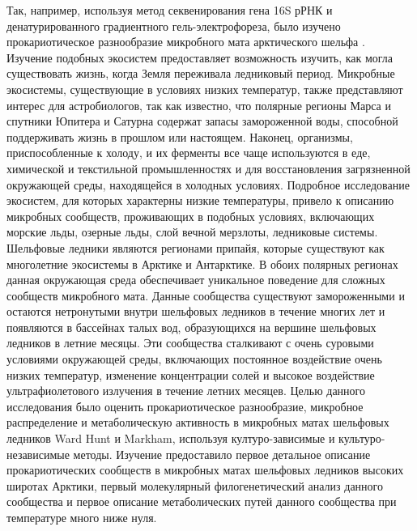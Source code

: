 Так, например, используя метод секвенирования гена 16S рРНК и денатурированного градиентного гель-электрофореза, было изучено прокариотическое разнообразие микробного мата арктического шельфа \cite{Bottos2008}. Изучение подобных экосистем предоставляет возможность изучить, как могла существовать жизнь, когда Земля переживала ледниковый период. Микробные экосистемы, существующие в условиях низких температур, также представляют интерес для астробиологов, так как известно, что полярные регионы Марса и спутники Юпитера и Сатурна содержат запасы замороженной воды, способной поддерживать жизнь в прошлом или настоящем. Наконец, организмы, приспособленные к холоду,  и их ферменты все чаще используются в еде, химической и текстильной промышленностях и для восстановления загрязненной окружающей среды, находящейся в холодных условиях. Подробное исследование экосистем, для которых характерны низкие температуры, привело к описанию микробных сообществ, проживающих в подобных условиях, включающих морские льды, озерные льды, слой вечной мерзлоты, ледниковые системы. Шельфовые ледники являются регионами припайя, которые существуют как многолетние экосистемы в Арктике и Антарктике. В обоих полярных регионах данная окружающая среда обеспечивает уникальное поведение для сложных сообществ микробного мата. Данные сообщества существуют замороженными и остаются нетронутыми внутри шельфовых ледников в течение многих лет и появляются в бассейнах талых вод, образующихся на вершине  шельфовых ледников в летние месяцы. Эти сообщества сталкивают с очень суровыми условиями окружающей среды, включающих постоянное воздействие очень низких температур, изменение концентрации солей и высокое воздействие ультрафиолетового излучения в течение летних месяцев. Целью данного исследования было оценить прокариотическое разнообразие, микробное распределение и метаболическую активность в микробных матах шельфовых ледников Ward Hunt и Markham, используя културо-зависимые и культуро-независимые методы. Изучение предоставило первое детальное описание прокариотических сообществ в микробных матах шельфовых ледников высоких широтах Арктики, первый молекулярный филогенетический анализ данного сообщества и первое описание метаболических путей данного сообщества при температуре много ниже нуля. 

